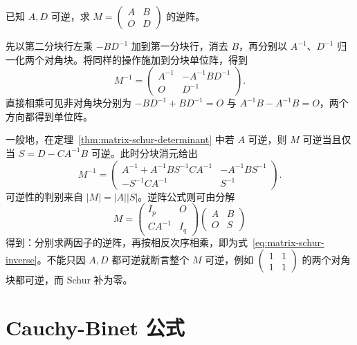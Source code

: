 \begin{example}
\label{ex:matrix-block-triangular-inverse}
已知 $A,D$ 可逆，求 $M=\begin{pmatrix}A&B\\O&D\end{pmatrix}$ 的逆阵。
\end{example}

\begin{solve}
先以第二分块行左乘 $-BD^{-1}$ 加到第一分块行，消去 $B$，再分别以 $A^{-1}$、$D^{-1}$ 归一化两个对角块。将同样的操作施加到分块单位阵，得到
\begin{equation}
\label{eq:matrix-block-triangular-inverse}
    M^{-1}=\begin{pmatrix}
        A^{-1}&-A^{-1}BD^{-1}\\O&D^{-1}
    \end{pmatrix}.
\end{equation}
直接相乘可见非对角块分别为 $-BD^{-1}+BD^{-1}=O$ 与 $A^{-1}B-A^{-1}B=O$，两个方向都得到单位阵。
\end{solve}

一般地，在定理~\ref{thm:matrix-schur-determinant} 中若 $A$ 可逆，则 $M$ 可逆当且仅当 $S=D-CA^{-1}B$ 可逆。此时分块消元给出
\begin{equation}
\label{eq:matrix-schur-inverse}
    M^{-1}=\begin{pmatrix}
        A^{-1}+A^{-1}BS^{-1}CA^{-1}&-A^{-1}BS^{-1}\\
        -S^{-1}CA^{-1}&S^{-1}
    \end{pmatrix}.
\end{equation}
可逆性的判别来自 $|M|=|A||S|$。逆阵公式则可由分解
\[
    M=\begin{pmatrix}I_p&O\\CA^{-1}&I_q\end{pmatrix}
       \begin{pmatrix}A&B\\O&S\end{pmatrix}
\]
得到：分别求两因子的逆阵，再按相反次序相乘，即为式~\eqref{eq:matrix-schur-inverse}。不能只因 $A,D$ 都可逆就断言整个 $M$ 可逆，例如 $\begin{pmatrix}1&1\\1&1\end{pmatrix}$ 的两个对角块都可逆，而 Schur 补为零。

\section{Cauchy-Binet 公式}
\label{sec:matrix-cauchy-binet}

